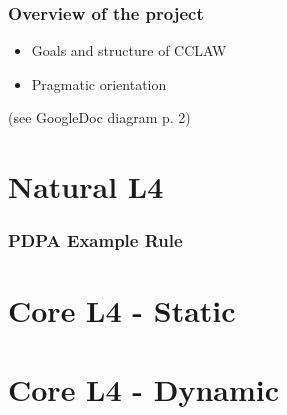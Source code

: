 \documentclass{beamer}
\begin{document}
\begin{frame}[fragile]\frametitle{Overview of the project}

  \begin{itemize}
  \item Goals and structure of CCLAW
  \item Pragmatic orientation
  \end{itemize}

   (see GoogleDoc diagram p. 2)


\end{frame}


\section{Natural L4}


\begin{frame}[fragile]\frametitle{PDPA Example Rule}




\end{frame}


\section{Core L4 - Static}


\section{Core L4 - Dynamic}



\end{document}
